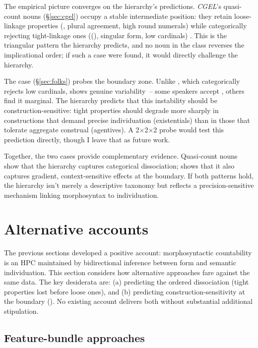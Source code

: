 \documentclass[12pt,a4paper]{article}
\begin{document}
The empirical picture converges on the hierarchy's predictions. \textit{CGEL}'s quasi-count nouns (\S\ref{sec:cgel}) occupy a stable intermediate position: they retain loose-linkage properties (, plural agreement, high round numerals) while categorically rejecting tight-linkage ones ((), singular form, low cardinals) \citep[p.~345]{huddleston2002}. This is the triangular pattern the hierarchy predicts, and no noun in the class reverses the implicational order; if such a case were found, it would directly challenge the hierarchy.

The  case (\S\ref{sec:folks}) probes the boundary zone. Unlike , which categorically rejects low cardinals,  shows genuine variability~-- some speakers accept , others find it marginal. The hierarchy predicts that this instability should be construction-sensitive: tight properties should degrade more sharply in constructions that demand precise individuation (existentials) than in those that tolerate aggregate construal (agentives). A 2$\times$2$\times$2 probe would test this prediction directly, though I leave that as future work.

Together, the two cases provide complementary evidence. Quasi-count nouns show that the hierarchy captures categorical dissociation;  shows that it also captures gradient, context-sensitive effects at the boundary. If both patterns hold, the hierarchy isn't merely a descriptive taxonomy but reflects a precision-sensitive mechanism linking morphosyntax to individuation.

\section{Alternative accounts}

The previous sections developed a positive account: morphosyntactic countability is an HPC maintained by bidirectional inference between form and semantic individuation. This section considers how alternative approaches fare against the same data. The key desiderata are: (a) predicting the ordered dissociation (tight properties lost before loose ones), and (b) predicting construction-sensitivity at the boundary (). No existing account delivers both without substantial additional stipulation.

\subsection{Feature-bundle approaches}
\end{document}
